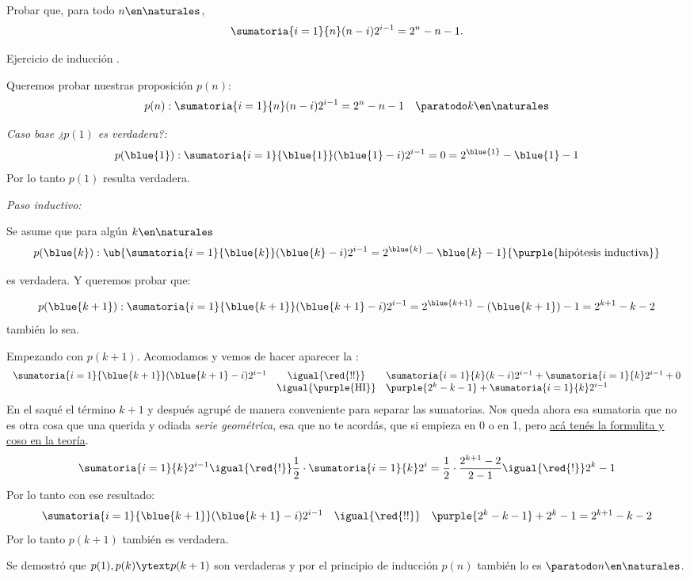 \begin{enunciado}{\ejExtra}
  Probar que, para todo $n \en \naturales$,
  $$
    \sumatoria{i=1}{n}(n-i)2^{i-1} = 2^n -n -1.
  $$
\end{enunciado}
Ejercicio de inducción .

Queremos probar nuestras proposición $p(n)$:
$$
  p(n) : \sumatoria{i=1}{n}(n-i)2^{i-1} = 2^n - n -1 \quad \paratodo k \en \naturales
$$

\textit{Caso base  ¿$p(1)$ es verdadera?:}
$$
  p(\blue{1}) : \sumatoria{i=1}{\blue{1}}(\blue{1} - i)2^{i-1} = 0 =  2^{\blue{1}} - \blue{1} -1
$$
Por lo tanto $p(1)$ resulta verdadera.

\textit{Paso inductivo:}

Se asume que para algún $k\en \naturales$
$$
  p(\blue{k}) : \ub{
  \sumatoria{i=1}{\blue{k}}(\blue{k} - i)2^{i-1} =  2^{\blue{k}} - \blue{k} - 1
  }{\purple{\text{hipótesis inductiva}}}
$$

es verdadera. Y queremos probar que:

$$
  p(\blue{k+1}) : \sumatoria{i=1}{\blue{k+1}}(\blue{k+1}-i)2^{i-1} =  2^{\blue{k+1}} - (\blue{k+1}) - 1 = 2^{k+1} - k - 2
$$
también lo sea.

Empezando con $p(k+1)$. Acomodamos y vemos de hacer aparecer la :
$$
  \begin{array}{rcl}
    \sumatoria{i=1}{\blue{k+1}}(\blue{k+1}-i)2^{i-1} & \igual{\red{!!}}           & \sumatoria{i=1}{k}(k-i)2^{i-1} + \sumatoria{i=1}{k} 2^{i-1} + 0 \\
                                                     & \igual{\purple{\text{HI}}} & \purple{2^k - k - 1} +  \sumatoria{i=1}{k} 2^{i-1}
  \end{array}
$$
En el \red{!!} saqué el término $k+1$ y después agrupé de manera conveniente para separar las sumatorias. Nos queda ahora esa sumatoria que no es
otra cosa que una querida y odiada \textit{serie geométrica}, esa que no te acordás, que si empieza en 0 o en 1,
pero \hyperlink{2-teoria:geometrica}{acá tenés la formulita y coso en la teoría}.
$$
  \sumatoria{i=1}{k} 2^{i-1} \igual{\red{!}}
  \frac{1}{2} \cdot \sumatoria{i=1}{k} 2^i =
  \frac{1}{2} \cdot \frac{2^{k+1} - 2}{2 - 1}
  \igual{\red{!}}
  2^k - 1
$$
Por lo tanto con ese resultado:
$$
  \begin{array}{rcl}
    \sumatoria{i=1}{\blue{k+1}}(\blue{k+1}-i)2^{i-1} & \igual{\red{!!}} & \purple{2^k - k - 1} + 2^k - 1 =  2^{k+1} - k - 2
  \end{array}
$$
Por lo tanto $p(k+1)$ también es verdadera.

\bigskip

Se demostró que $p(1), p(k) \ytext p(k+1)$ son verdaderas y por el principio de inducción $p(n)$ también lo es $\paratodo n \en \naturales$.

\begin{aportes}
  \item {}
  \item {}
\end{aportes}
